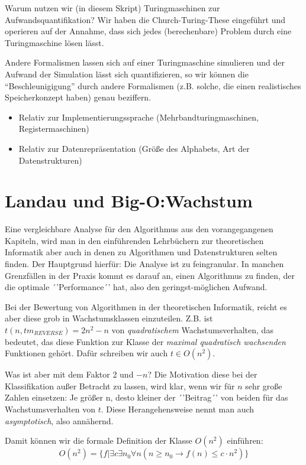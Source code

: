 Warum nutzen wir (in diesem Skript) Turingmaschinen zur Aufwandsquantifikation?
Wir haben die Church-Turing-These eingeführt und operieren auf der Annahme,
dass sich jedes (berechenbare) Problem durch eine Turingmaschine lösen lässt.

Andere Formalismen lassen sich auf einer Turingmaschine simulieren und
der Aufwand der Simulation lässt sich quantifizieren,
so wir können die ``Beschleunigigung'' durch andere Formalismen
(z.B. solche, die einen realistisches Speicherkonzept haben)
genau beziffern.

\begin{itemize}
    \item Relativ zur Implementierungssprache (Mehrbandturingmaschinen, Registermaschinen)
    \item Relativ zur Datenrepräsentation (Größe des Alphabets, Art der Datenstrukturen)
\end{itemize}

\section{Landau und Big-O:\@ Wachstum}

Eine vergleichbare Analyse für den Algorithmus aus den vorangegangenen Kapiteln,
wird man in den einführenden Lehrbüchern zur theoretischen Informatik
aber auch in denen zu Algorithmen und Datenstrukturen selten finden.
Der Hauptgrund hierfür: Die Analyse ist zu feingranular.
In manchen Grenzfällen in der Praxis kommt es darauf an,
einen Algorithmus zu finden, der die optimale ´'Performance´' hat,
also den geringst-möglichen Aufwand.

Bei der Bewertung von Algorithmen in der theoretischen Informatik,
reicht es aber diese grob in Wachstumsklassen einzuteilen.
Z.B. ist $t(n, tm_{REVERSE}) = 2n^2 - n$ von \emph{quadratischem} Wachstumsverhalten,
das bedeutet, das diese Funktion zur Klasse der \emph{maximal quadratisch wachsenden}
Funktionen gehört.
Dafür schreiben wir auch $t \in O(n^2)$.

Was ist aber mit dem Faktor 2 und $-n$?
Die Motivation diese bei der Klassifikation außer Betracht zu lassen, wird
klar, wenn wir für $n$ sehr große Zahlen einsetzen:
Je größer n, desto kleiner der ´'Beitrag´' von beiden für das Wachstumsverhalten von $t$.
Diese Herangehensweise nennt man auch \emph{asymptotisch}, also annähernd.

Damit können wir die formale Definition der Klasse $O(n^2)$ einführen:
\[
O(n^2) = \{f|\exists c \exists n_0 \forall n (n \geq n_0 \rightarrow f(n) \leq c \cdot n^2)\}
\]

